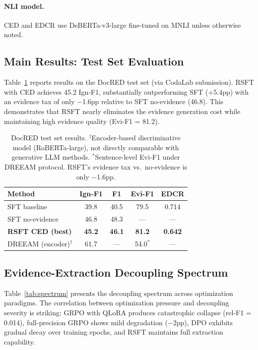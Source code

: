 \documentclass[11pt,a4paper]{article}
\begin{document}
\paragraph{NLI model.}
CED and EDCR use DeBERTa-v3-large fine-tuned on MNLI unless otherwise noted.

\subsection{Main Results: Test Set Evaluation}
\label{sec:test}

Table~\ref{tab:test} reports results on the DocRED test set (via CodaLab submission).
RSFT with CED achieves 45.2 Ign-F1, substantially outperforming SFT (+5.4pp) with an evidence tax of only $-$1.6pp relative to SFT no-evidence (46.8).
This demonstrates that RSFT nearly eliminates the evidence generation cost while maintaining high evidence quality (Evi-F1 = 81.2).

\begin{table}[t]
\centering
\small
\begin{tabular}{lcccc}
\toprule
\textbf{Method} & \textbf{Ign-F1} & \textbf{F1} & \textbf{Evi-F1} & \textbf{EDCR} \\
\midrule
SFT baseline & 39.8 & 40.5 & 79.5 & 0.714 \\
SFT no-evidence & 46.8 & 48.3 & --- & --- \\
\textbf{RSFT CED (best)} & \textbf{45.2} & \textbf{46.1} & \textbf{81.2} & \textbf{0.642} \\
\midrule
DREEAM (encoder)$^\dagger$ & 61.7 & --- & 54.0$^*$ & --- \\
\bottomrule
\end{tabular}
\caption{DocRED test set results. $^\dagger$Encoder-based discriminative model (RoBERTa-large), not directly comparable with generative LLM methods. $^*$Sentence-level Evi-F1 under DREEAM protocol. RSFT's evidence tax vs.\ no-evidence is only $-$1.6pp.}
\label{tab:test}
\end{table}

\subsection{Evidence-Extraction Decoupling Spectrum}
\label{sec:decoupling}

Table~\ref{tab:spectrum} presents the decoupling spectrum across optimization paradigms.
The correlation between optimization pressure and decoupling severity is striking: GRPO with QLoRA produces catastrophic collapse (rel-F1 = 0.014), full-precision GRPO shows mild degradation ($-$2pp), DPO exhibits gradual decay over training epochs, and RSFT maintains full extraction capability.
\end{document}
